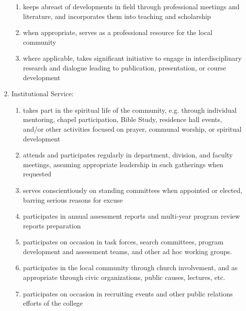 \documentclass[letterpaper, 11pt]{article}
\begin{document}
\begin{enumerate}[label=\alph*)]
{\begin{enumerate}[label=\arabic*)]
							\item{keeps abreast of developments in field through professional meetings and literature, and incorporates them into teaching and scholarship}
							\item{when appropriate, serves as a professional resource for the local community}
							\item{where applicable, takes significant initiative to engage in interdisciplinary research and dialogue leading to publication, presentation, or course development}
						\end{enumerate}
					}
					\item{Institutional Service:
						\begin{enumerate}[label=\arabic*)]
							\item{takes part in the spiritual life of the community, e.g. through individual mentoring, chapel participation, Bible Study, residence hall events, and/or other activities focused on prayer, communal worship, or spiritual development}
							\item{attends and participates regularly in department, division, and faculty meetings, assuming appropriate leadership in such gatherings when requested}
							\item{serves conscientiously on standing committees when appointed or elected, barring serious reasons for excuse}
							\item{participates in annual assessment reports and multi-year program review reports preparation}
							\item{participates on occasion in task forces, search committees, program development and assessment teams, and other ad hoc working groups.}
							\item{participates in the local community through church involvement, and as appropriate through civic organizations, public causes, lectures, etc.}
							\item{participates on occasion in recruiting events and other public relations efforts of the college}
						\end{enumerate}
					}
				\end{enumerate}
\end{document}

